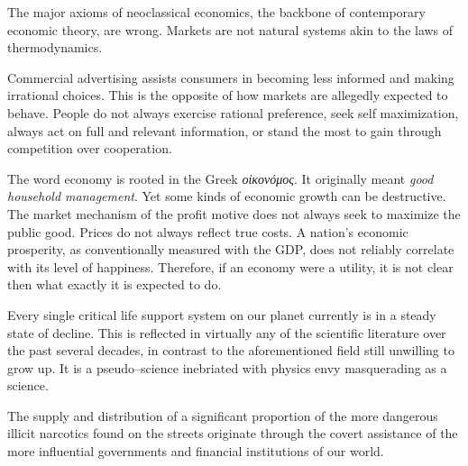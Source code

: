 
The major axioms of neoclassical economics, the backbone of contemporary economic theory, are wrong. Markets are not natural systems akin to the laws of thermodynamics.
\footnotecite[lasn2012]

Commercial advertising assists consumers in becoming less informed and making irrational choices. This is the opposite of how markets are allegedly expected to behave. People do not always exercise rational preference, seek self maximization, always act on full and relevant information, 
or stand the most to gain through competition over cooperation.

The word economy is rooted in the Greek {\it οἰκονόμος}. It originally meant {\it good household management}. Yet some kinds of economic growth can be destructive.
\footnotecite[h2oil]
The market mechanism of the profit motive does not always seek to maximize the public good.
Prices do not always reflect true costs.
\footnotecite[roberts2013]
\footnotecite[cobb1999]
\footnotecite[oxfam2004]
\footnotecite[raj2010]
\footnotecite[extras={ See sections 4.6 and 4.11.}][agenda_21]
A nation's economic prosperity, as conventionally measured with the GDP, does not reliably correlate with its level of happiness.
 Therefore, if an economy were a utility, it is not clear then what exactly it is expected to do.

Every single critical life support system on our planet currently is in a steady state of decline. This is reflected in virtually any of the scientific literature over the past several decades, in contrast to the aforementioned field still unwilling to grow up. It is a pseudo--science inebriated with physics envy masquerading as a science.


The supply and distribution of a significant proportion of the more dangerous illicit narcotics found on the streets originate through the covert assistance of the more influential governments and financial institutions of our world.
\footnotecite[webb1996]

